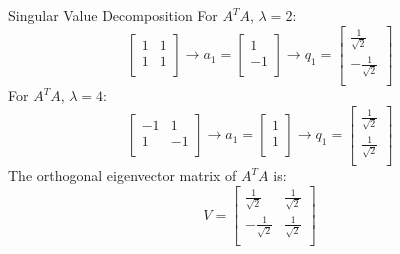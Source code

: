 \documentclass{beamer}
\begin{document}
\begin{frame}{Singular Value Decomposition}
    For $A^TA$, $\lambda =2$:
\begin{equation*}
    \left[ \begin{matrix}
        1&		1\\
        1&		1\\
    \end{matrix} \right] \rightarrow a_1=\left[ \begin{array}{c}
        1\\
        -1\\
    \end{array} \right] \rightarrow q_1=\left[ \begin{array}{c}
        \frac{1}{\sqrt{2}}\\
        -\frac{1}{\sqrt{2}}\\
    \end{array} \right]
\end{equation*}
For $A^TA$, $\lambda =4$:
\begin{equation*}
    \left[ \begin{matrix}
        -1&		1\\
        1&		-1\\
    \end{matrix} \right] \rightarrow a_1=\left[ \begin{array}{c}
        1\\
        1\\
    \end{array} \right] \rightarrow q_1=\left[ \begin{array}{c}
        \frac{1}{\sqrt{2}}\\
        \frac{1}{\sqrt{2}}\\
    \end{array} \right]
\end{equation*}
The orthogonal eigenvector matrix of $A^TA$ is:
\begin{equation*}
    V=\left[ \begin{matrix}
        \frac{1}{\sqrt{2}}&		\frac{1}{\sqrt{2}}\\
        -\frac{1}{\sqrt{2}}&		\frac{1}{\sqrt{2}}\\
    \end{matrix} \right]
\end{equation*}
\end{frame}
\end{document}
